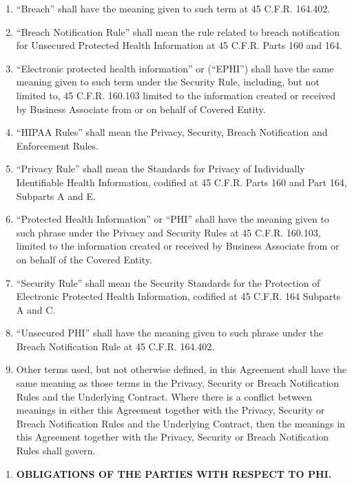\documentclass[11pt,a4paper]{article} %
\providecommand{\tightlist}{%
  \setlength{\itemsep}{0pt}\setlength{\parskip}{0pt}}
\begin{document}
\begin{enumerate}
\def\labelenumi{\Alph{enumi}.}
\tightlist
\item
  ``Breach'' shall have the meaning given to such term at 45 C.F.R.    
  164.402.

\item ``Breach Notification Rule'' shall mean the rule related to breach
notification for Unsecured Protected Health Information at 45 C.F.R.
Parts 160 and 164.
\item``Electronic protected health information'' or (``EPHI'') shall have
the same meaning given to such term under the Security Rule, including,
but not limited to, 45 C.F.R.     160.103 limited to the information
created or received by Business Associate from or on behalf of Covered
Entity.

\item``HIPAA Rules'' shall mean the Privacy, Security, Breach Notification
and Enforcement Rules.

\item``Privacy Rule'' shall mean the Standards for Privacy of Individually
Identifiable Health Information, codified at 45 C.F.R. Parts 160 and
Part 164, Subparts A and E.

\item ``Protected Health Information'' or ``PHI'' shall have the meaning
given to such phrase under the Privacy and Security Rules at 45 C.F.R.    
160.103, limited to the information created or received by Business
Associate from or on behalf of the Covered Entity.
\item``Security Rule'' shall mean the Security Standards for the
Protection of Electronic Protected Health Information, codified at 45
C.F.R.     164 Subparts A and C.

\item``Unsecured PHI'' shall have the meaning given to such phrase under
the Breach Notification Rule at 45 C.F.R.     164.402.

\item Other terms used, but not otherwise defined, in this Agreement shall
have the same meaning as those terms in the Privacy, Security or Breach
Notification Rules and the Underlying Contract. Where there is a
conflict between meanings in either this Agreement together with the
Privacy, Security or Breach Notification Rules and the Underlying
Contract, then the meanings in this Agreement together with the Privacy,
Security or Breach Notification Rules shall govern.
\end{enumerate}
\begin{enumerate}
\def\labelenumi{\Roman{enumi}.}
\setcounter{enumi}{1}
\tightlist
\item
  \textbf{OBLIGATIONS OF THE PARTIES WITH RESPECT TO PHI.}
\end{enumerate}
\end{document}
